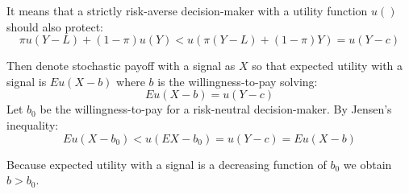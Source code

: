 \documentclass[12pt,a4paper]{article}
\begin{document}
It means that a strictly risk-averse decision-maker with a utility function $u()$ should also protect:
$$\pi u(Y-L)+(1-\pi)u(Y)<u(\pi(Y-L)+(1-\pi)Y)=u(Y-c)$$

Then denote stochastic payoff with a signal as $X$ so that expected utility with a signal is $Eu(X-b)$ where $b$ is the willingness-to-pay solving:
$$Eu(X-b)=u(Y-c)$$
 Let $b_0$ be the willingness-to-pay for a risk-neutral decision-maker. By Jensen's inequality:
$$Eu(X-b_0)<u(EX-b_0)=u(Y-c)=Eu(X-b)$$

Because expected utility with a signal is a decreasing function of $b_0$ we obtain $b>b_0$.
\end{document}
